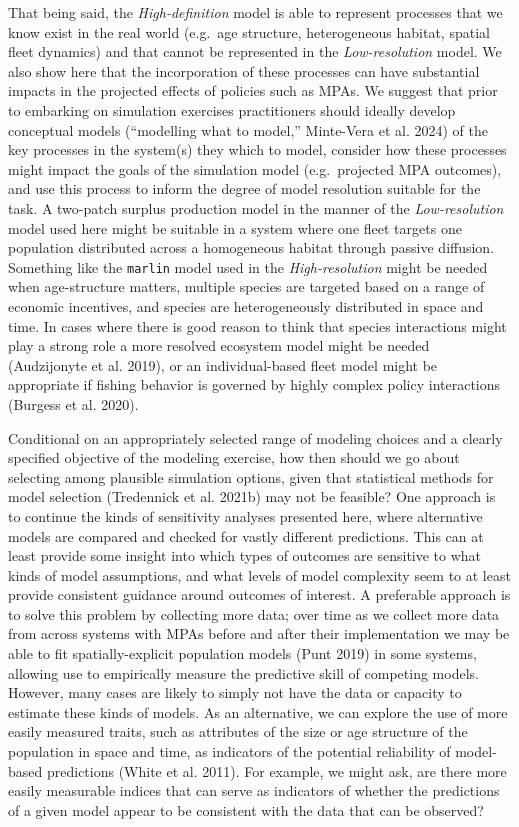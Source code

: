 \documentclass[
  default,
  lineno,
  referee]{sn-jnl}
\begin{document}
That being said, the \emph{High-definition} model is able to represent
processes that we know exist in the real world (e.g.~age structure,
heterogeneous habitat, spatial fleet dynamics) and that cannot be
represented in the \emph{Low-resolution} model. We also show here that
the incorporation of these processes can have substantial impacts in the
projected effects of policies such as MPAs. We suggest that prior to
embarking on simulation exercises practitioners should ideally develop
conceptual models (``modelling what to model,'' Minte-Vera et al. 2024)
of the key processes in the system(s) they which to model, consider how
these processes might impact the goals of the simulation model
(e.g.~projected MPA outcomes), and use this process to inform the degree
of model resolution suitable for the task. A two-patch surplus
production model in the manner of the \emph{Low-resolution} model used
here might be suitable in a system where one fleet targets one
population distributed across a homogeneous habitat through passive
diffusion. Something like the \texttt{marlin} model used in the
\emph{High-resolution} might be needed when age-structure matters,
multiple species are targeted based on a range of economic incentives,
and species are heterogeneously distributed in space and time. In cases
where there is good reason to think that species interactions might play
a strong role a more resolved ecosystem model might be needed
(Audzijonyte et al. 2019), or an individual-based fleet model might be
appropriate if fishing behavior is governed by highly complex policy
interactions (Burgess et al. 2020).

Conditional on an appropriately selected range of modeling choices and a
clearly specified objective of the modeling exercise, how then should we
go about selecting among plausible simulation options, given that
statistical methods for model selection (Tredennick et al. 2021b) may
not be feasible? One approach is to continue the kinds of sensitivity
analyses presented here, where alternative models are compared and
checked for vastly different predictions. This can at least provide some
insight into which types of outcomes are sensitive to what kinds of
model assumptions, and what levels of model complexity seem to at least
provide consistent guidance around outcomes of interest. A preferable
approach is to solve this problem by collecting more data; over time as
we collect more data from across systems with MPAs before and after
their implementation we may be able to fit spatially-explicit population
models (Punt 2019) in some systems, allowing use to empirically measure
the predictive skill of competing models. However, many cases are likely
to simply not have the data or capacity to estimate these kinds of
models. As an alternative, we can explore the use of more easily
measured traits, such as attributes of the size or age structure of the
population in space and time, as indicators of the potential reliability
of model-based predictions (White et al. 2011). For example, we might
ask, are there more easily measurable indices that can serve as
indicators of whether the predictions of a given model appear to be
consistent with the data that can be observed?
\end{document}
